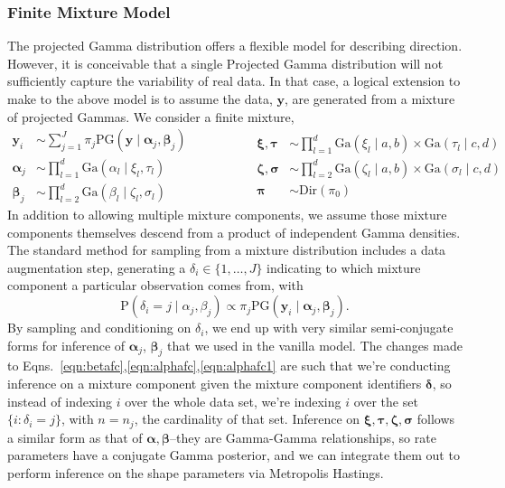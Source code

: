 \subsubsection{Finite Mixture Model}
The projected Gamma distribution offers a flexible model for describing direction.  However, it is
  conceivable that a single Projected Gamma distribution will not sufficiently capture the
  variability of real data.  In that case, a logical extension to make to the above model is to
  assume the data, $\bm{ y}$, are generated from a mixture of projected Gammas.  We consider a finite
  mixture,
  \begin{equation}
    \label{eqn:fmixp}
    \begin{aligned}
      \bm{ y}_i &\sim \sum_{j = 1}^J\pi_j\text{PG}\left(\bm{ y}\mid \bm{ \alpha}_j, \bm{ \beta}_j\right)\\
      \bm{ \alpha}_j &\sim {\textstyle \prod}_{l = 1}^d \text{Ga}\left(\alpha_l\mid\xi_l,\tau_l\right)\\
      \bm{ \beta}_j &\sim {\textstyle \prod}_{l = 2}^d \text{Ga}\left(\beta_l\mid\zeta_l,\sigma_l\right)
    \end{aligned}
    \hspace{2cm}
    \begin{aligned}
      \bm{ \xi},\bm{\tau} &\sim {\textstyle \prod}_{l = 1}^d \text{Ga}(\xi_l\mid a,b) \times \text{Ga}(\tau_l\mid c,d)\\
      \bm{ \zeta},\bm{\sigma} &\sim {\textstyle\prod}_{l = 2}^d\text{Ga}(\zeta_l \mid a,b)\times \text{Ga}(\sigma_l\mid c,d)\\
      \bm{ \pi} &\sim \text{Dir}(\pi_0)
    \end{aligned}
  \end{equation}
  In addition to allowing multiple mixture components, we assume those mixture components themselves
  descend from a product of independent Gamma densities. The standard method for sampling from a
  mixture distribution includes a data augmentation step, generating a
  $\delta_i \in \lbrace 1,\ldots, J\rbrace$ indicating to which mixture component a
  particular observation comes from, with
  \begin{equation*}
    \text{P}(\delta_i = j\mid\alpha_j,\beta_j) \propto \pi_j\text{PG}(\bm{ y}_i\mid \bm{ \alpha}_j,\bm{ \beta}_j).
  \end{equation*}
  By sampling and conditioning on $\delta_i$, we end up with very similar semi-conjugate forms for
  inference of $\bm{ \alpha}_j$, $\bm{ \beta}_j$ that we used in the vanilla model.  The changes made
  to Eqns.~\ref{eqn:betafc},\ref{eqn:alphafc},\ref{eqn:alphafc1} are such that we're conducting inference
  on a mixture component given the mixture component identifiers $\bm{ \delta}$, so instead of indexing
  $i$ over the whole data set, we're indexing $i$ over the set $\{i :\delta_i = j\}$, with $n = n_j$,
  the cardinality of that set. Inference on $\bm{ \xi,\tau,\zeta,\sigma}$ follows a similar form as
  that of $\bm{ \alpha,\beta}$--they are Gamma-Gamma relationships, so rate parameters have a conjugate
  Gamma posterior, and we can integrate them out to perform inference on the shape parameters via
  Metropolis Hastings.

